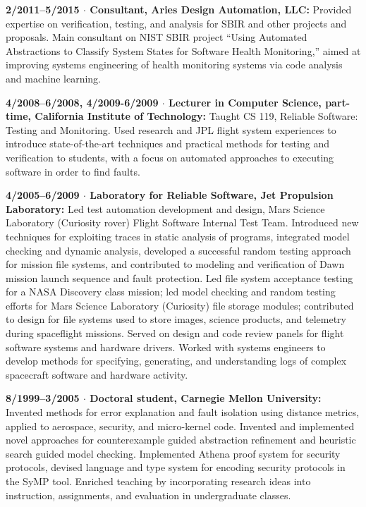\documentclass[ComputerScience]{vita}
\begin{document}
\begin{vita}
\begin{Experience}
  \item {\bf 2/2011--5/2015 $\cdot$ Consultant, Aries Design Automation, LLC:} Provided expertise on verification, testing, and analysis for SBIR and other projects and proposals.  Main consultant on NIST SBIR project ``Using Automated Abstractions to Classify System States for Software Health Monitoring,'' aimed at improving systems engineering of health monitoring systems via code analysis and machine learning.

  \item {\bf 4/2008--6/2008, 4/2009-6/2009 $\cdot$ Lecturer in
    Computer Science, part-time, California Institute of Technology:}
    Taught CS 119, Reliable Software: Testing and Monitoring.  Used
    research and JPL flight system experiences to introduce
    state-of-the-art techniques and practical methods for testing and
    verification to students, with a focus on automated approaches to
    executing software in order to find faults.

  \item {\bf 4/2005--6/2009 $\cdot$ Laboratory for Reliable Software,
    Jet Propulsion Laboratory:} Led test automation development and
    design, Mars Science Laboratory (Curiosity rover) Flight Software
    Internal Test Team.  Introduced new techniques for exploiting
    traces in static analysis of programs, integrated model checking
    and dynamic analysis, developed a successful random testing
    approach for mission file systems, and contributed to modeling and
    verification of Dawn mission launch sequence and fault protection.
    Led file system acceptance testing for a NASA Discovery class
    mission; led model checking and random testing efforts for Mars
    Science Laboratory (Curiosity) file storage modules; contributed
    to design for file systems used to store images, science products,
    and telemetry during spaceflight missions.  Served on design and
    code review panels for flight software systems and hardware
    drivers.  Worked with systems engineers to develop methods for
    specifying, generating, and understanding logs of complex
    spacecraft software and hardware activity.

  \item {\bf 8/1999--3/2005 $\cdot$ Doctoral student, Carnegie Mellon
    University:} Invented methods for error explanation and fault
    isolation using distance metrics, applied to aerospace, security, and
    micro-kernel code.  Invented and implemented novel approaches for
    counterexample guided abstraction refinement and heuristic search
    guided model checking.  Implemented Athena proof system for
    security protocols, devised language and type system for encoding
    security protocols in the SyMP tool.  Enriched teaching by
    incorporating research ideas into instruction, assignments, and
    evaluation in undergraduate classes.


\end{Experience}
\end{vita}
\end{document}
